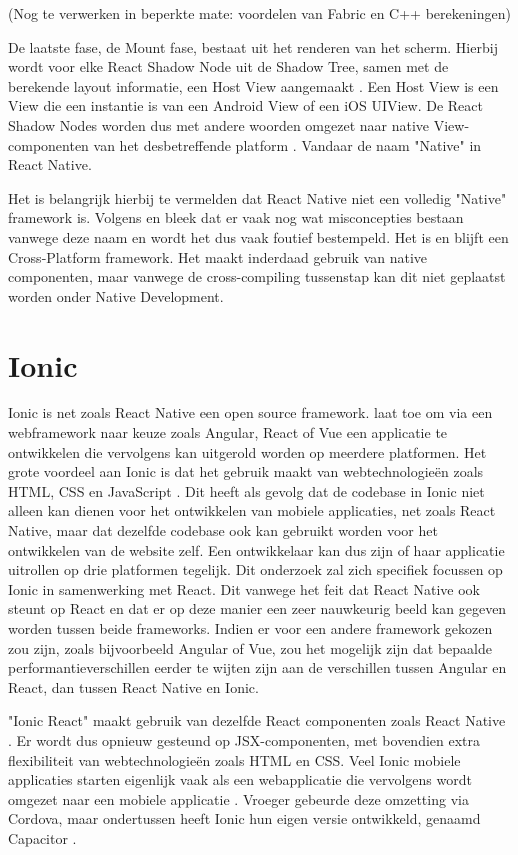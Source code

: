 (Nog te verwerken in beperkte mate: voordelen van Fabric en C++ berekeningen)

De laatste fase, de Mount fase, bestaat uit het renderen van het scherm. Hierbij wordt voor elke React Shadow Node uit de Shadow Tree, samen met de berekende layout informatie, een Host View aangemaakt \autocite{Bron15}. Een Host View is een View die een instantie is van een Android View of een iOS UIView. De React Shadow Nodes worden dus met andere woorden omgezet naar native View-componenten van het desbetreffende platform \autocite{Bron15}. Vandaar de naam "Native" in React Native.

Het is belangrijk hierbij te vermelden dat React Native niet een volledig "Native" framework is. Volgens \autocite{Bron3} en \autocite{Bron2} bleek dat er vaak nog wat misconcepties bestaan vanwege deze naam en wordt het dus vaak foutief bestempeld. Het is en blijft een Cross-Platform framework. Het maakt inderdaad gebruik van native componenten, maar vanwege de cross-compiling tussenstap kan dit niet geplaatst worden onder Native Development.

\section{Ionic}
\label{sec:ionic}

Ionic is net zoals React Native een open source framework. \textcite{Bron8} laat toe om via een webframework naar keuze zoals Angular, React of Vue een applicatie te ontwikkelen die vervolgens kan uitgerold worden op meerdere platformen. Het grote voordeel aan Ionic is dat het gebruik maakt van webtechnologieën zoals HTML, CSS en JavaScript \autocite{Bron8}. Dit heeft als gevolg dat de codebase in Ionic niet alleen kan dienen voor het ontwikkelen van mobiele applicaties, net zoals React Native, maar dat dezelfde codebase ook kan gebruikt worden voor het ontwikkelen van de website zelf. Een ontwikkelaar kan dus zijn of haar applicatie uitrollen op drie platformen tegelijk. Dit onderzoek zal zich specifiek focussen op Ionic in samenwerking met React. Dit vanwege het feit dat React Native ook steunt op React en dat er op deze manier een zeer nauwkeurig beeld kan gegeven worden tussen beide frameworks. Indien er voor een andere framework gekozen zou zijn, zoals bijvoorbeeld Angular of Vue, zou het mogelijk zijn dat bepaalde performantieverschillen eerder te wijten zijn aan de verschillen tussen Angular en React, dan tussen React Native en Ionic.

"Ionic React" maakt gebruik van dezelfde React componenten zoals React Native \autocite{Bron8}. Er wordt dus opnieuw gesteund op JSX-componenten, met bovendien extra flexibiliteit van webtechnologieën zoals HTML en CSS. Veel Ionic mobiele applicaties starten eigenlijk vaak als een webapplicatie die vervolgens wordt omgezet naar een mobiele applicatie \autocite{Bron19}. Vroeger gebeurde deze omzetting via Cordova, maar ondertussen heeft Ionic hun eigen versie ontwikkeld, genaamd Capacitor \autocite{Bron19}.

